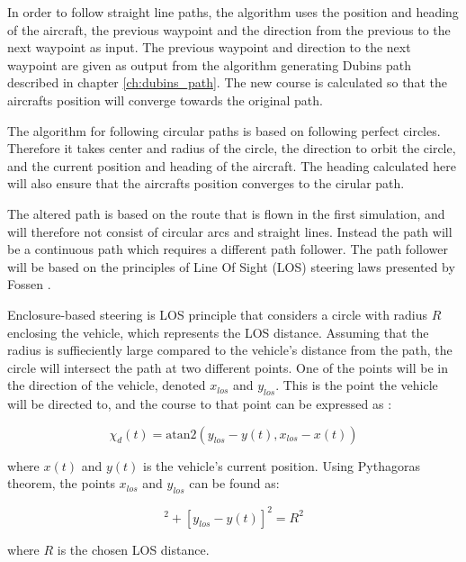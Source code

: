 In order to follow straight line paths, the algorithm uses the position and heading of the aircraft, the previous waypoint and the direction from the previous to the next waypoint as input. The previous waypoint and direction to the next waypoint are given as output from the algorithm generating Dubins path described in chapter \ref{ch:dubins_path}. The new course is calculated so that the aircrafts position will converge towards the original path.

The algorithm for following circular paths is based on following perfect circles. Therefore it takes center and radius of the circle, the direction to orbit the circle, and the current position and heading of the aircraft. The heading calculated here will also ensure that the aircrafts position converges to the cirular path.

The altered path is based on the route that is flown in the first simulation, and will therefore not consist of circular arcs and straight lines. Instead the path will be a continuous path which requires a different path follower. The path follower will be based on the principles of Line Of Sight (LOS) steering laws presented by Fossen \cite{fartoyFOSSEN}.

Enclosure-based steering is LOS principle that considers a circle with radius $R$ enclosing the vehicle, which represents the LOS distance. Assuming that the radius is suffieciently large compared to the vehicle's distance from the path, the circle will intersect the path at two different points. One of the points will be in the direction of the vehicle, denoted $x_{los}$ and $y_{los}$. This is the point the vehicle will be directed to, and the course to that point can be expressed as \cite{fartoyFOSSEN}:

\begin{equation}
	\chi_d(t) = \text{atan2}(y_{los} - y(t), x_{los} - x(t))
\end{equation}

where $x(t)$ and $y(t)$ is the vehicle's current position. Using Pythagoras theorem, the points $x_{los}$ and $y_{los}$ can be found as:

\begin{equation}
	[x_{los} - x(t)]^2 + [y_{los} - y(t)]^2 = R^2
\end{equation}

where $R$ is the chosen LOS distance.